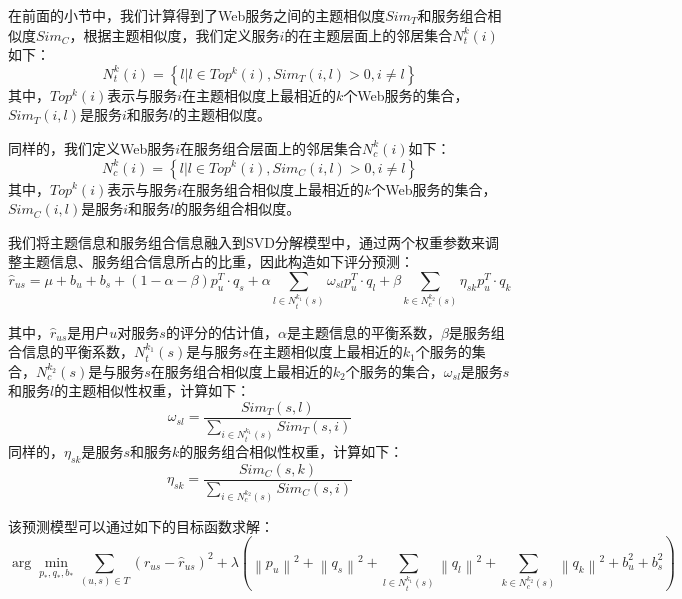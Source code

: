 \documentclass[master,winfonts]{njuthesis}
\begin{document}
在前面的小节中，我们计算得到了Web服务之间的主题相似度$Sim_T$和服务组合相似度$Sim_C$，根据主题相似度，我们定义服务$i$的在主题层面上的邻居集合$N^k_t(i)$如下：
\begin{equation}
N^k_t(i)=\left \{ l|l\in Top^k(i),Sim_T(i,l)>0,i\neq l \right \}
\end{equation}
其中，$Top^k(i)$表示与服务$i$在主题相似度上最相近的$k$个Web服务的集合，$Sim_T(i,l)$是服务$i$和服务$l$的主题相似度。

同样的，我们定义Web服务$i$在服务组合层面上的邻居集合$N^k_c(i)$如下：
\begin{equation}
N^k_c(i)=\left \{ l|l\in Top^k(i),Sim_C(i,l)>0,i\neq l \right \}
\end{equation}
其中，$Top^k(i)$表示与服务$i$在服务组合相似度上最相近的$k$个Web服务的集合，$Sim_C(i,l)$是服务$i$和服务$l$的服务组合相似度。

我们将主题信息和服务组合信息融入到SVD分解模型中，通过两个权重参数来调整主题信息、服务组合信息所占的比重，因此构造如下评分预测：
\begin{equation}
\hat{r}_{us} = \mu+b_u+b_s+(1-\alpha-\beta)p_u^T\cdot q_s+\alpha \sum \limits_{l \in N^{k_1}_t(s)} \omega_{sl}p_u^T\cdot q_l+\beta \sum \limits_{k \in N^{k_2}_c(s)} \eta_{sk}p_u^T\cdot q_k\label{3-12}
\end{equation}

其中，$\hat{r}_{us}$是用户$u$对服务$s$的评分的估计值，$\alpha$是主题信息的平衡系数，$\beta$是服务组合信息的平衡系数，$N^{k_1}_t(s)$是与服务$s$在主题相似度上最相近的$k_1$个服务的集合，$N^{k_2}_c(s)$是与服务$s$在服务组合相似度上最相近的$k_2$个服务的集合，$\omega_{sl}$是服务$s$和服务$l$的主题相似性权重，计算如下：
\begin{equation}
\omega_{sl} = \frac{Sim_T(s,l)}{\sum \limits_{i \in N^{k_1}_t(s)}Sim_T(s,i)}
\end{equation}
同样的，$\eta_{sk}$是服务$s$和服务$k$的服务组合相似性权重，计算如下：
\begin{equation}
\eta_{sk} = \frac{Sim_C(s,k)}{\sum \limits_{i \in N^{k_2}_c(s)}Sim_C(s,i)}
\end{equation}

该预测模型可以通过如下的目标函数求解：
\begin{equation}
\arg\min_{p_*,q_*,b_*}\sum \limits_{(u,s) \in T}(r_{us}-\hat{r}_{us})^2+\lambda(\left \| p_u \right \|^2+\left \| q_s \right \|^2+\sum \limits_{l \in N^{k_1}_t(s)}\left \| q_l \right \|^2+\sum \limits_{k \in N^{k_2}_c(s)}\left \| q_k \right \|^2+b_u^2+b_s^2 )
\end{equation}
\end{document}
